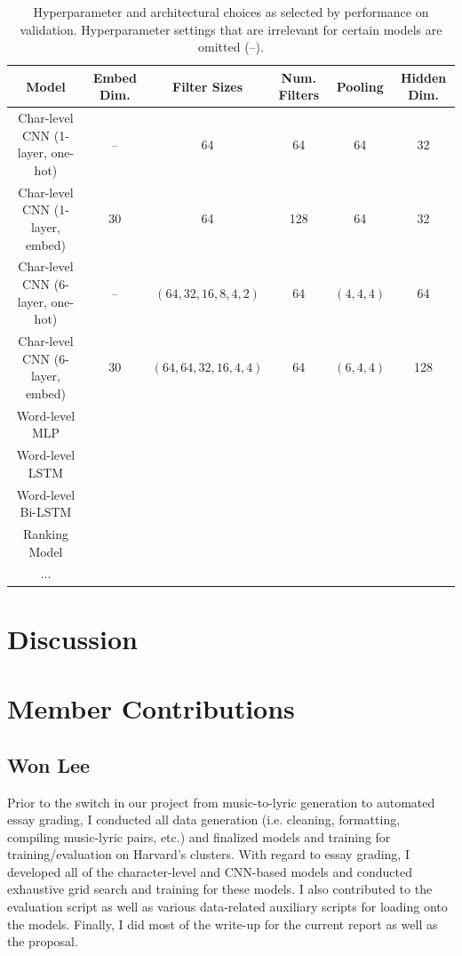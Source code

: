 \documentclass[10pt,psamsfonts]{amsart}
\theoremstyle{definition}
\theoremstyle{remark}
\numberwithin{equation}{section}
\begin{document}
\begin{table}
	\begin{tabular}{c|c|c|c|c|c}
		Model & Embed Dim. & Filter Sizes & Num. Filters & Pooling & Hidden Dim. \\\hline
		Char-level CNN (1-layer, one-hot) & -- & 64 & 64 & 64 & 32 \\
		Char-level CNN (1-layer, embed) &  30 & 64 & 128 & 64 & 32 \\
		Char-level CNN (6-layer, one-hot) & -- & $(64, 32, 16, 8, 4, 2)$ & 64 & $(4,4,4)$ & 64 \\
		Char-level CNN (6-layer, embed) & 30 & $(64, 64, 32, 16, 4, 4)$ & 64 & $(6,4,4)$ & 128 \\
		Word-level MLP  & & & & & \\
		Word-level LSTM  & & & & & \\
		Word-level Bi-LSTM  & & & & & \\
		Ranking Model & & & & & \\
		...  & & & & &
	\end{tabular}
	\caption{Hyperparameter and architectural choices as selected by performance on validation. Hyperparameter settings that are irrelevant for certain models are omitted (--).}
	\label{fig:params}
\end{table}

\section*{Discussion}

\section*{Member Contributions}

\subsection*{Won Lee}

Prior to the switch in our project from music-to-lyric generation to automated essay grading, I conducted all data generation (i.e. cleaning, formatting, compiling music-lyric pairs, etc.) and finalized models and training for training/evaluation on Harvard's clusters. With regard to essay grading, I developed all of the character-level and CNN-based models and conducted exhaustive grid search and training for these models. I also contributed to the evaluation script as well as various data-related auxiliary scripts for loading onto the models. Finally, I did most of the write-up for the current report as well as the proposal.
\end{document}
